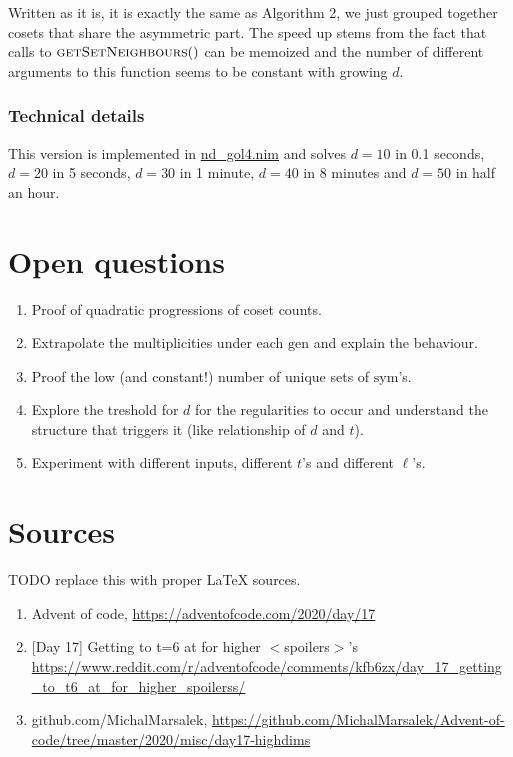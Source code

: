 \documentclass[]{article}
\newcommand{\sym}{\mathrm{sym}}
\newcommand{\gen}{\mathrm{gen}}
\begin{document}
Written as it is, it is exactly the same as Algorithm 2, we just grouped together cosets that share the asymmetric part. The speed up stems from the fact that calls to  $\Call{getSetNeighbours}$ can be memoized and the number of different arguments to this function seems to be constant with growing $d$.
	
	\subsubsection{Technical details}
	
	This version is implemented in \href{https://github.com/MichalMarsalek/Advent-of-code/blob/master/2020/misc/day17-highdims/nd_gol3.nim}{nd\_gol4.nim} and solves $d=10$ in 0.1 seconds, $d=20$ in 5 seconds, $d=30$ in 1 minute, $d=40$ in 8 minutes and $d=50$ in half an hour.
	
	\newpage
	\section{Open questions}
	\begin{enumerate}
		\item Proof of quadratic progressions of coset counts.
		\item Extrapolate the multiplicities under each $\gen$ and explain the behaviour.
		\item Proof the low (and constant!) number of unique sets of $\sym$'s.
		\item Explore the treshold for $d$ for the regularities to occur and understand the structure that triggers it (like relationship of $d$ and $t$).
		\item Experiment with different inputs, different $t$'s and different $\ell$'s.
	\end{enumerate}
	
	
	\newpage
	\section{Sources}
	TODO replace this with proper \LaTeX $ $ $ $sources.
	
	\begin{enumerate}
		\item Advent of code, \url{https://adventofcode.com/2020/day/17}
		\item {}[Day 17] Getting to t=6 at for higher $<$spoilers$>$'s \url{https://www.reddit.com/r/adventofcode/comments/kfb6zx/day_17_getting_to_t6_at_for_higher_spoilerss/}
		\item github.com/MichalMarsalek, \url{https://github.com/MichalMarsalek/Advent-of-code/tree/master/2020/misc/day17-highdims}
	\end{enumerate}
\end{document}
